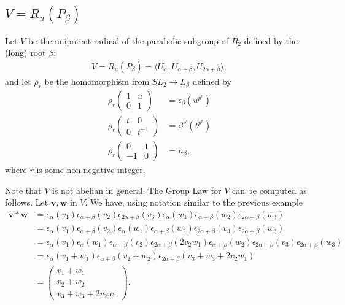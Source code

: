 \subsection{$V = R_u(P_\beta)$}
\label{b2:beta}

Let $V$ be the unipotent radical of the parabolic subgroup of $B_2$ defined by the (long) root $\beta$:
\begin{align*}
V=R_u(P_\beta)=\langle U_\alpha, U_{\alpha + \beta}, U_{2\alpha + \beta} \rangle,
\end{align*}
and let $\rho_r$ be the homomorphism from $SL_2 \rightarrow L_\beta$ defined by
\begin{align*}
\rho_r\left(\begin{matrix} 1 & u \\ 0 & 1\end{matrix}\right) &= \epsilon_\beta(u^{p^r}) \\
\rho_r\left(\begin{matrix} t & 0 \\ 0 & t^{-1}\end{matrix}\right) &= \beta^\vee(t^{p^r}) \\
\rho_r\left(\begin{matrix} 0 & 1 \\ -1 & 0\end{matrix}\right) &= n_\beta,
\end{align*}
where $r$ is some non-negative integer.

Note that $V$ is not abelian in general. The Group Law for $V$ can be computed as follows. Let $\mathbf{v}, \mathbf{w}$ in $V$. We have, using notation similar to the previous example
\begin{align*}
\mathbf{v}*\mathbf{w}
&= 
\epsilon_\alpha(v_1)\epsilon_{\alpha+\beta}(v_2)\epsilon_{2\alpha+\beta}(v_3) \epsilon_\alpha(w_1)\epsilon_{\alpha+\beta}(w_2)\epsilon_{2\alpha+\beta}(w_3)\\
&= 
\epsilon_\alpha(v_1)\epsilon_{\alpha+\beta}(v_2) \epsilon_\alpha(w_1)\epsilon_{\alpha+\beta}(w_2)\epsilon_{2\alpha+\beta}(v_3)\epsilon_{2\alpha+\beta}(w_3)\\
&= 
\epsilon_\alpha(v_1) \epsilon_\alpha(w_1) \epsilon_{\alpha + \beta}(v_2)\epsilon_{2\alpha+\beta}(2v_2w_1)\epsilon_{\alpha+\beta}(w_2)\epsilon_{2\alpha+\beta}(v_3)\epsilon_{2\alpha+\beta}(w_3)\\
&= 
\epsilon_\alpha(v_1 + w_1) \epsilon_{\alpha + \beta}(v_2 + w_2)\epsilon_{2\alpha+\beta}(v_3 + w_3 + 2v_2w_1)\\
&=
\left(\begin{matrix}
v_1 + w_1 \\
v_2 + w_2 \\
v_3 + w_3 + 2v_2w_1
\end{matrix}\right).
\end{align*}

